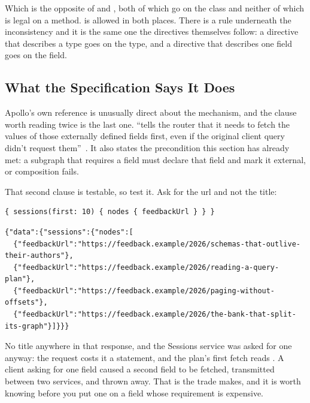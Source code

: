 %
Which is the opposite of \code{[Key]} and \code{[ReferenceResolver]}, both of
which go on the class and neither of which is legal on a method.
\code{[External]} is allowed in both places. There is a rule underneath the
inconsistency and it is the same one the directives themselves follow: a
directive that describes a type goes on the type, and a directive that
describes one field goes on the field.

\subsection{What the Specification Says It Does}

%
Apollo's own reference is unusually direct about the mechanism, and the clause
worth reading twice is the last one. 
\enquote{tells the router that it needs to fetch the values of those externally
defined fields first, even if the original client query didn't
request them}~\autocite{apollodirectives}. It also states the precondition this
section has already met: a subgraph that requires a field must declare that
field and mark it external, or composition fails.

%
That second clause is testable, so test it. Ask for the url and not the title:

\begin{verbatim}
{ sessions(first: 10) { nodes { feedbackUrl } } }
\end{verbatim}

\begin{verbatim}
{"data":{"sessions":{"nodes":[
  {"feedbackUrl":"https://feedback.example/2026/schemas-that-outlive-their-authors"},
  {"feedbackUrl":"https://feedback.example/2026/reading-a-query-plan"},
  {"feedbackUrl":"https://feedback.example/2026/paging-without-offsets"},
  {"feedbackUrl":"https://feedback.example/2026/the-bank-that-split-its-graph"}]}}}
\end{verbatim}

%
No title anywhere in that response, and the Sessions service was asked for one
anyway: the request costs it a statement, and the plan's first fetch reads
. A client asking
for one field caused a second field to be fetched, transmitted between two
services, and thrown away. That is the trade  makes, and it is
worth knowing before you put one on a field whose requirement is expensive.

